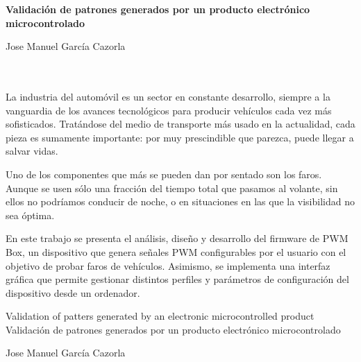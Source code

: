 \begin{center}
    \large\bfseries Validación de patrones generados por un producto electrónico microcontrolado 
\end{center}

\begin{center}
    Jose Manuel García Cazorla\\
\end{center}

\\

\vspace{0.7cm}
\\

La industria del automóvil es un sector en constante desarrollo, siempre a la vanguardia de los avances tecnológicos para producir vehículos cada vez más sofisticados. Tratándose del medio de transporte más usado en la actualidad, cada pieza es sumamente importante: por muy prescindible que parezca, puede llegar a salvar vidas.

Uno de los componentes que más se pueden dan por sentado son los faros. Aunque se usen sólo una fracción del tiempo total que pasamos al volante, sin ellos no podríamos conducir de noche, o en situaciones en las que la visibilidad no sea óptima.

En este trabajo se presenta el análisis, diseño y desarrollo del firmware de PWM Box, un dispositivo que genera señales PWM configurables por el usuario con el objetivo de probar faros de vehículos. Asimismo, se implementa una interfaz gráfica que permite gestionar distintos perfiles y parámetros de configuración del dispositivo desde un ordenador.

\cleardoublepage

\thispagestyle{empty}

\begin{center}
    Validation of patters generated by an electronic microcontrolled product
   Validación de patrones generados por un producto electrónico microcontrolado 
\end{center}

\begin{center}
    Jose Manuel García Cazorla\\
\end{center}

\\

